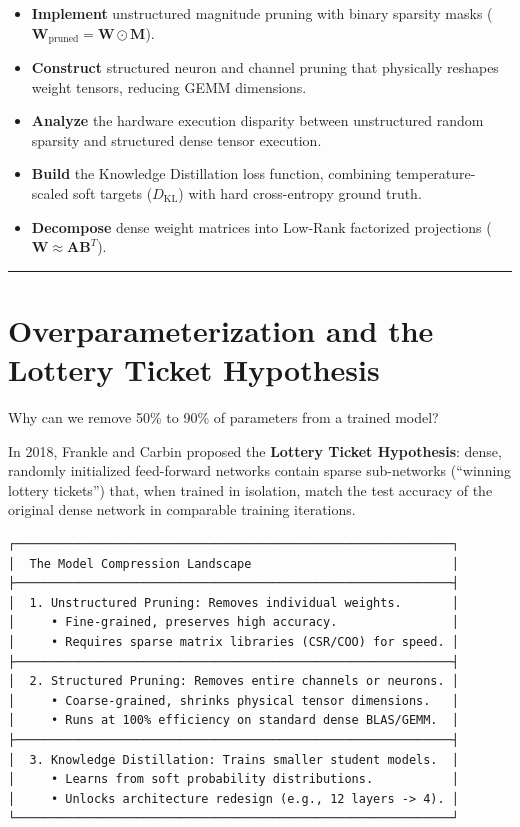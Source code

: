 \documentclass[
  letterpaper,
]{scrbook}
\providecommand{\tightlist}{%
  \setlength{\itemsep}{0pt}\setlength{\parskip}{0pt}}
\begin{document}
\begin{itemize}
\tightlist
\item
  \textbf{Implement} unstructured magnitude pruning with binary sparsity
  masks (\(\mathbf{W}_{\text{pruned}} = \mathbf{W} \odot \mathbf{M}\)).
\item
  \textbf{Construct} structured neuron and channel pruning that
  physically reshapes weight tensors, reducing GEMM dimensions.
\item
  \textbf{Analyze} the hardware execution disparity between unstructured
  random sparsity and structured dense tensor execution.
\item
  \textbf{Build} the Knowledge Distillation loss function, combining
  temperature-scaled soft targets (\(D_{\text{KL}}\)) with hard
  cross-entropy ground truth.
\item
  \textbf{Decompose} dense weight matrices into Low-Rank factorized
  projections (\(\mathbf{W} \approx \mathbf{A} \mathbf{B}^T\)).
\end{itemize}

\begin{center}\rule{0.5\linewidth}{0.5pt}\end{center}

\section{Overparameterization and the Lottery Ticket
Hypothesis}\label{overparameterization-and-the-lottery-ticket-hypothesis}

Why can we remove 50\% to 90\% of parameters from a trained model?

In 2018, Frankle and Carbin proposed the \textbf{Lottery Ticket
Hypothesis}: dense, randomly initialized feed-forward networks contain
sparse sub-networks (``winning lottery tickets'') that, when trained in
isolation, match the test accuracy of the original dense network in
comparable training iterations.

\begin{verbatim}
┌─────────────────────────────────────────────────────────────┐
│  The Model Compression Landscape                            │
├─────────────────────────────────────────────────────────────┤
│  1. Unstructured Pruning: Removes individual weights.       │
│     • Fine-grained, preserves high accuracy.                │
│     • Requires sparse matrix libraries (CSR/COO) for speed. │
├─────────────────────────────────────────────────────────────┤
│  2. Structured Pruning: Removes entire channels or neurons. │
│     • Coarse-grained, shrinks physical tensor dimensions.   │
│     • Runs at 100% efficiency on standard dense BLAS/GEMM.  │
├─────────────────────────────────────────────────────────────┤
│  3. Knowledge Distillation: Trains smaller student models.  │
│     • Learns from soft probability distributions.           │
│     • Unlocks architecture redesign (e.g., 12 layers -> 4). │
└─────────────────────────────────────────────────────────────┘
\end{verbatim}
\end{document}
